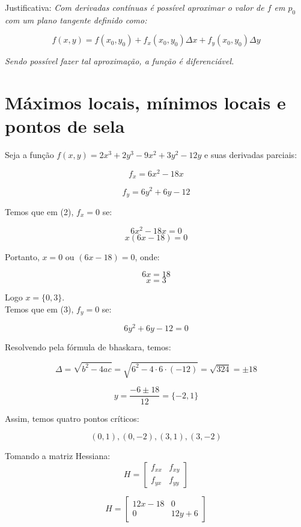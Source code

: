 \documentclass[11pt]{article}
\begin{document}
Justificativa: \textit{Com derivadas contínuas é possível aproximar o valor de $f$ em $p_0$ com um plano tangente definido como:}

\begin{equation}
f(x, y) = f(x_0, y_0) + f_x(x_0, y_0)\Delta x + f_y(x_0, y_0)\Delta y
\end{equation}

\textit{Sendo possível fazer tal aproximação, a função é diferenciável.}

\section{Máximos locais, mínimos locais e pontos de sela}

Seja a função $f(x, y) = 2x^3 + 2y^3 - 9x^2 + 3y^2 - 12y$ e suas derivadas parciais:

\begin{equation}
f_x = 6x^2 - 18x
\end{equation}

\begin{equation}
f_y = 6y^2 + 6y - 12
\end{equation}

Temos que em (2), $f_x = 0$ se:

$$6x^2 - 18x = 0$$
$$x(6x - 18) = 0$$

Portanto, $x = 0$ ou $(6x - 18) = 0$, onde:

$$6x = 18$$
$$x = 3$$

Logo $x = \{0, 3\}$.\\

Temos que em (3), $f_y = 0$ se:

$$6y^2 + 6y - 12 = 0$$

Resolvendo pela fórmula de bhaskara, temos:

$$\Delta = \sqrt{b^2 - 4ac} = \sqrt{6^2 - 4 \cdot 6 \cdot(-12)} = \sqrt{324} = \pm 18$$

$$y = \frac{-6 \pm 18}{12} = \{-2, 1\}$$

Assim, temos quatro pontos críticos:

$$(0, 1), (0, -2), (3, 1), (3, -2)$$

Tomando a matriz Hessiana:\\

\[
H = 
\begin{bmatrix}
	f_{xx} & f_{xy}\\
	f_{yx} & f_{yy}
\end{bmatrix}
\]

\[
H = 
\begin{bmatrix}
	12x-18 & 0\\
	0      & 12y+6
\end{bmatrix}
\]
\end{document}
